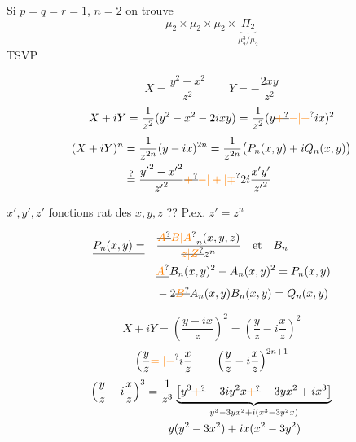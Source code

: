 Si $p=q=r=1$, $n=2$ on trouve
\[
\mu_2\times\mu_2\times\mu_2\times\underbrace{\Pi_2}_{\mu_2^3/\mu_2}
\]
TSVP


\begin{center}\end{center}

\[
X=\frac{y^2-x^2}{z^2}\qquad Y=-\frac{2xy}{z^2}
\]
\[
X+iY=\frac1{z^2}(y^2-x^2-2ixy)=\frac1{z^2}(y\deleted{\unsure{+}}\unsure{-|+}ix)^2
\]
\[
\begin{aligned}
(X+iY)^n&=\frac1{z^{2n}}(y-ix)^{2n}=\frac1{z^{2n}}\bigl(P_n(x,y)+iQ_n(x,y)\bigr)\\
&\overset{?}{=}\frac{{y'}^2-{x'}^2}{{z'}^2}\deleted{\unsure{+}}\unsure{-|+|\mp}2i\frac{x'y'}{{z'}^2}
\end{aligned}
\]

$x',y',z'$ fonctions rat des $x,y,z$ ?? P.ex. $z'=z^n$

\[
\begin{aligned}
\deleted{P_n(x,y)=}\quad&\frac{\deleted{\unsure{A}}\unsure{B|A}_n(x,y,z)}{\deleted{\unsure{z|Z}}z^n}\quad\text{et}\quad B_n\\
&\deleted{\unsure{A}}B_n(x,y)^2-A_n(x,y)^2=P_n(x,y)\\
&-2\deleted{\unsure{B}}A_n(x,y)B_n(x,y)=Q_n(x,y)
\end{aligned}
\]

\[
X+iY=\left(\frac{y-ix}{z}\right)^2=\left(\frac yz-i\frac xz\right)^2
\]
\[
\Bigl(\frac yz\unsure{=|-}i\frac xz
\qquad \left(\frac yz-i\frac xz\right)^{2n+1}
\]
\[
\begin{aligned}
\left(\frac yz-i\frac xz\right)^3&=\frac1{z^3}
\underbrace{\bigl[y^3\deleted{\unsure{+}}-3iy^2x\deleted{\unsure{+}}-3yx^2+ix^3\bigr]}_{y^3-3yx^2+i(x^3-3y^2x)}\\
&\qquad y(y^2-3x^2)+ix(x^2-3y^2)
\end{aligned}
\]

